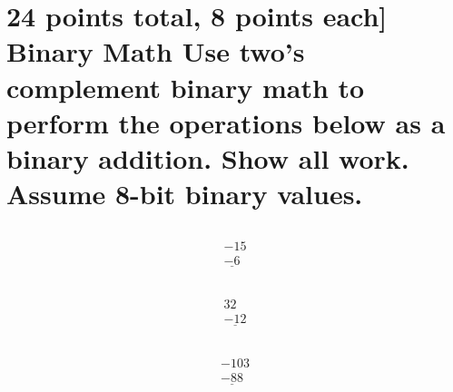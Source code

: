 \documentclass[12pt]{article}
\begin{document}
\section{
24 points total, 8 points each] Binary Math
Use two's complement binary math to perform the operations below as a binary addition.
Show all work. Assume 8-bit binary values.
}
\subsection{}
\begin{equation}
	\begin{split}
		-15\\ \underline{-6}
	\end{split}
\end{equation}
\subsection{}
\begin{equation}
	\begin{split}
		32\\  \underline{-12}
	\end{split}
\end{equation}
\subsection{}
\begin{equation}
	\begin{split}
		-103\\  \underline{-88}
	\end{split}
\end{equation}
\end{document}
